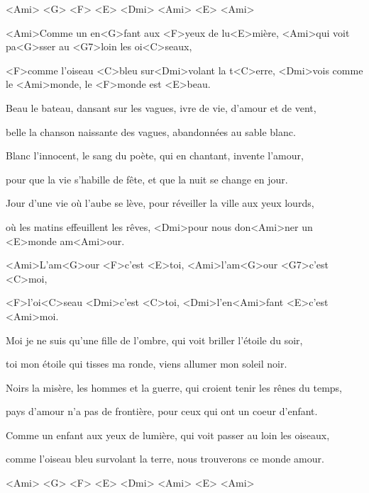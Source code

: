 

<Ami> <G> <F> <E>
<Dmi> <Ami> <E> <Ami>

\zs
<Ami>Comme un en<G>fant aux <F>yeux de lu<E>mière, <Ami>qui voit pa<G>sser au <G7>loin les oi<C>seaux,

<F>comme l'oiseau <C>bleu sur<Dmi>volant la t<C>erre, <Dmi>vois comme le <Ami>monde, le <F>monde est <E>beau.
\ks

\zs
Beau le bateau, dansant sur les vagues, ivre de vie, d'amour et de vent,

belle la chanson naissante des vagues, abandonnées au sable blanc.
\ks

\zs
Blanc l'innocent, le sang du poète, qui en chantant, invente l'amour,

pour que la vie s'habille de fête, et que la nuit se change en jour.
\ks

\zs
Jour d'une vie où l'aube se lève, pour réveiller la ville aux yeux lourds,

où les matins effeuillent les rêves, <Dmi>pour nous don<Ami>ner un <E>monde am<Ami>our.
\ks

\zr
<Ami>L'am<G>our <F>c'est <E>toi, <Ami>l'am<G>our <G7>c'est <C>moi,

<F>l'oi<C>seau <Dmi>c'est <C>toi, <Dmi>l'en<Ami>fant <E>c'est <Ami>moi.
\kr

\zs
Moi je ne suis qu'une fille de l'ombre, qui voit briller l'étoile du soir,

toi mon étoile qui tisses ma ronde, viens allumer mon soleil noir.
\ks

\zs
Noirs la misère, les hommes et la guerre, qui croient tenir les rênes du temps,

pays d'amour n'a pas de frontière, pour ceux qui ont un coeur d'enfant.
\ks

\zs
Comme un enfant aux yeux de lumière, qui voit passer au loin les oiseaux,

comme l'oiseau bleu survolant la terre, nous trouverons ce monde amour.
\ks

\zr\kr

\zr\kr

<Ami> <G> <F> <E>
<Dmi> <Ami> <E> <Ami>

\kp
